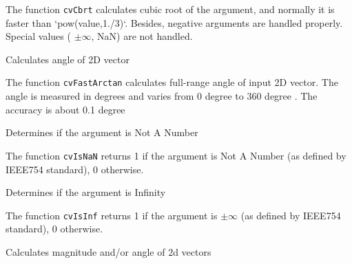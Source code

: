 The function \texttt{cvCbrt} calculates cubic root of the argument, and normally it is faster than `pow(value,1./3)`. Besides, negative arguments are handled properly. Special values ( $ \pm \infty $, NaN) are not handled.

\label{FastArctan}

Calculates angle of 2D vector


\begin{description}
\end{description}


The function \texttt{cvFastArctan} calculates full-range angle of input 2D vector. The angle is measured in degrees and varies from 0 degree  to 360 degree . The accuracy is about 0.1 degree 

\label{IsNaN}

Determines if the argument is Not A Number


\begin{description}
\end{description}


The function \texttt{cvIsNaN} returns 1 if the argument is Not A Number (as defined by IEEE754 standard), 0 otherwise.


\label{IsInf}

Determines if the argument is Infinity


\begin{description}
\end{description}


The function \texttt{cvIsInf} returns 1 if the argument is $ \pm \infty $ (as defined by IEEE754 standard), 0 otherwise.


\label{CartToPolar}

Calculates magnitude and/or angle of 2d vectors

